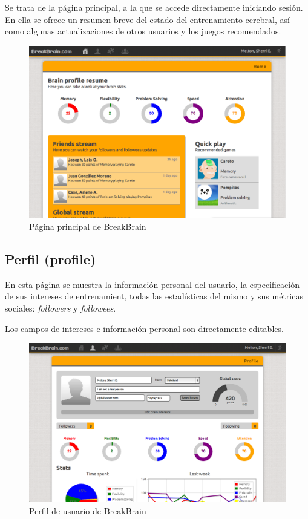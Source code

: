Se trata de la página principal, a la que se accede directamente iniciando sesión. En ella se ofrece un resumen breve del estado del entrenamiento cerebral, así como algunas actualizaciones de otros usuarios y los juegos recomendados.

\begin{figure}[h]
  \begin{center}
    \includegraphics[width=\textwidth]{./images/page-home.png}
  \end{center}  
  \caption{Página principal de BreakBrain}
  \label{fig::page-home}
\end{figure}

\subsection{Perfil (profile)}

En esta página se muestra la información personal del usuario, la especificación de sus intereses de entrenamient, todas las estadísticas del mismo y sus métricas sociales: {\it followers} y {\it followees}.

Los campos de intereses e información personal son directamente editables.

\begin{figure}[h]
  \begin{center}
    \includegraphics[width=\textwidth]{./images/page-profile.png}
  \end{center}  
  \caption{Perfil de usuario de BreakBrain}
  \label{fig::page-profile}
\end{figure}

